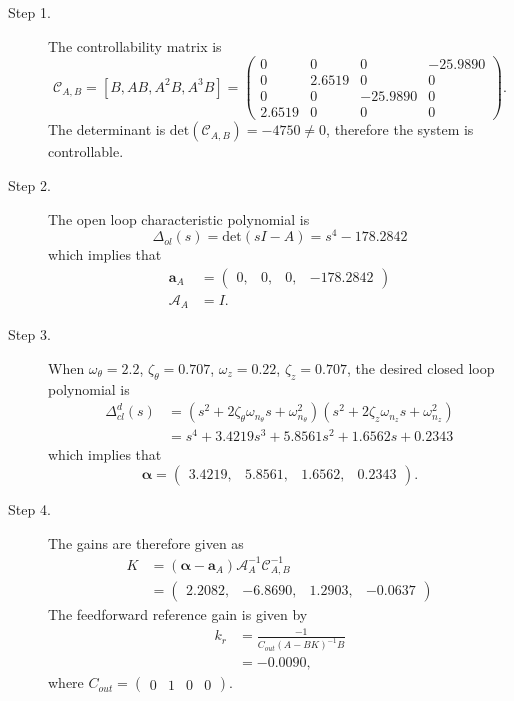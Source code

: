 \begin{description}
\item[Step 1.] 
The controllability matrix is 
\[
\mathcal{C}_{A,B} = [B, AB, A^2B, A^3B] = \begin{pmatrix}           
         0 &        0 &        0 & -25.9890 \\
         0 &   2.6519 &        0 &        0 \\
         0 &        0 &  -25.9890 &        0 \\
    2.6519 &        0 &        0 &        0
 \end{pmatrix}.
\]
The determinant is $\text{det}(\mathcal{C}_{A,B})=-4750\neq 0$, therefore the system is controllable.  
\item[Step 2.] The open loop characteristic polynomial is
\[
\Delta_{ol}(s)=\text{det}(sI-A) = s^4  -178.2842
\]
which implies that
\begin{align*}
\mathbf{a}_A &= \begin{pmatrix}0, & 0, & 0, & -178.2842 \end{pmatrix} \\
\mathcal{A}_A &= I.
\end{align*}

\item[Step 3.] When $\omega_\theta = 2.2$, $\zeta_\theta = 0.707$, $\omega_z=0.22$, $\zeta_z=0.707$, the desired closed loop polynomial is
\begin{align*}
\Delta_{cl}^d(s) &= (s^2+2\zeta_{\theta}\omega_{n_\theta} s + \omega_{n_\theta}^2)(s^2+2\zeta_{z}\omega_{n_z} s + \omega_{n_z}^2) \\
&=s^4 + 3.4219 s^3 + 5.8561 s^2 + 1.6562 s + 0.2343       
\end{align*}
which implies that
\[
\boldsymbol{\alpha} = \begin{pmatrix} 3.4219, &    5.8561, &    1.6562, &    0.2343\end{pmatrix}.
\]

\item[Step 4.]
The gains are therefore given as
\begin{align*}
K &= (\boldsymbol{\alpha}-\mathbf{a}_A)\mathcal{A}_A^{-1}\mathcal{C}_{A,B}^{-1} \\
  &= \begin{pmatrix} 2.2082, & -6.8690, &   1.2903, &  -0.0637 \end{pmatrix}
\end{align*}
The feedforward reference gain is given by
\begin{align*}
k_r &= \frac{-1}{C_{out}(A-BK)^{-1}B} \\
    &= -0.0090,
\end{align*}
where $C_{out}=\begin{pmatrix} 0 & 1 & 0 & 0 \end{pmatrix}$.
\end{description}

